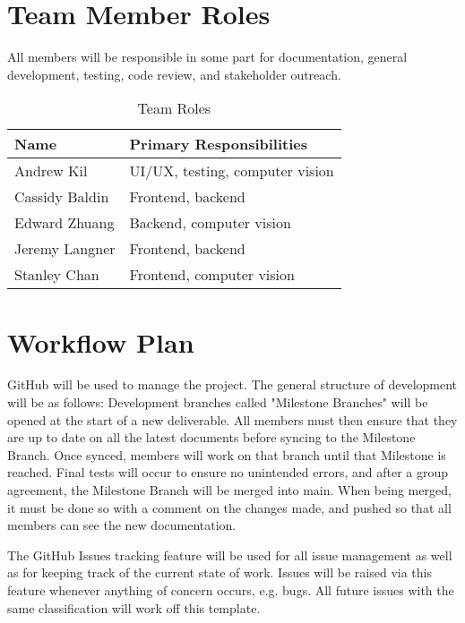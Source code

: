 \documentclass{article}
\begin{document}
\section{Team Member Roles}

All members will be responsible in some part for documentation, general development, testing, code review, and stakeholder outreach. 

\begin{table}%
\caption{Team Roles} \label{TblRoles}
\begin{tabularx}{\textwidth}{ll}
\toprule
\textbf{Name} & \textbf{Primary Responsibilities}\\
\midrule
Andrew Kil & UI/UX, testing, computer vision\\
Cassidy Baldin & Frontend, backend\\
Edward Zhuang & Backend, computer vision\\
Jeremy Langner & Frontend, backend\\
Stanley Chan & Frontend, computer vision\\
\bottomrule
\end{tabularx}
\end{table}

\section{Workflow Plan}

GitHub will be used to manage the project. The general structure of development will be as follows: Development branches called "Milestone Branches" will be opened at the start of a new deliverable. All members must then ensure that they are up to date on all the latest documents before syncing to the Milestone Branch. Once synced, members will work on that branch until that Milestone is reached. Final tests will occur to ensure no unintended errors, and after a group agreement, the Milestone Branch will be merged into main. When being merged, it must be done so with a comment on the changes made, and pushed so that all members can see the new documentation.

The GitHub Issues tracking feature will be used for all issue management as well as for keeping track of the current state of work. Issues will be raised via this feature whenever anything of concern occurs, e.g. bugs. All future issues with the same classification will work off this template.
\end{document}
